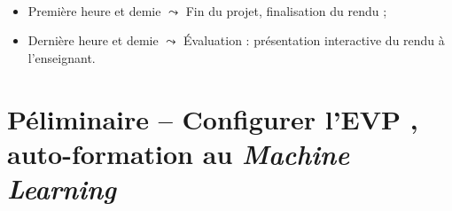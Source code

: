 \documentclass[11pt,french]{article}
\begin{document}
%
\vspace*{-3mm}
\begin {bclogo}[noborder=true, couleurBarre=Chocolate, logo=\large\ding{220}]{}
  \vspace*{-4mm}\\[-5mm]
  \begin{itemize}
    \item Première heure et demie $\leadsto$ Fin du projet, finalisation du rendu ;
    \item Dernière heure et demie $\leadsto$ Évaluation : présentation interactive du rendu à l'enseignant.
  \end{itemize}
\end{bclogo}  

\newpage
\vspace*{-16mm}
\section*{ Péliminaire -- Configurer l'EVP , auto-formation au {\em Machine Learning}}
\end{document}
